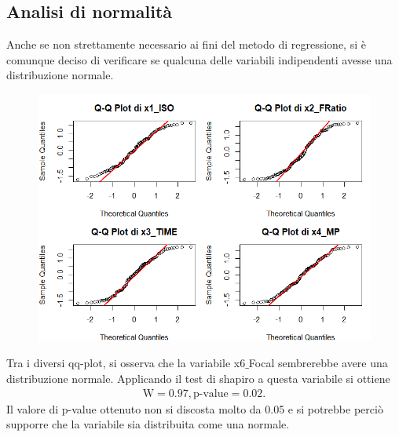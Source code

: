 \subsection{Analisi di normalità}
Anche se non strettamente necessario ai fini del metodo di regressione, si è comunque deciso di verificare se qualcuna delle variabili indipendenti avesse una distribuzione normale.\begin{figure}[h]
	\centering
	\includegraphics[width=0.9\linewidth]{../graphs/DescriptiveStatisticPlots/qqplot1/qqplot1}
	\caption{}
	\label{fig:qqplot1}
\end{figure}
Tra i diversi qq-plot, si osserva che la variabile x6$\_$Focal sembrerebbe avere una distribuzione normale. Applicando il test di shapiro a questa variabile si ottiene
\begin{align*}
	\text{W} = 0.97, \text{p-value} = 0.02.
\end{align*}
Il valore di p-value ottenuto non si discosta molto da 0.05 e si potrebbe perciò supporre che la variabile sia distribuita come una normale.
\begin{figure}[H]
\end{figure}




